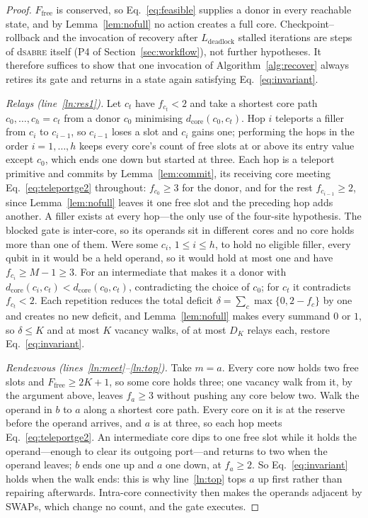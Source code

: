 \documentclass[journal]{IEEEtran}
\newcommand{\dSABRE}{d\textsc{sabre}}
\newcommand{\dcore}{d_{\mathrm{core}}}
\begin{document}
\begin{proof}
$F_{\mathrm{free}}$ is conserved, so Eq.~\eqref{eq:feasible} supplies a donor in every reachable state, and by Lemma~\ref{lem:nofull} no action creates a full core. Checkpoint--rollback and the invocation of recovery after $L_{\mathrm{deadlock}}$ stalled iterations are steps of \dSABRE{} itself (P4 of Section~\ref{sec:workflow}), not further hypotheses. It therefore suffices to show that one invocation of Algorithm~\ref{alg:recover} always retires its gate and returns in a state again satisfying Eq.~\eqref{eq:invariant}.

\emph{Relays (line~\ref{ln:res1}).} Let $c_t$ have $f_{c_t}<2$ and take a shortest core path $c_0,\dots,c_h=c_t$ from a donor $c_0$ minimising $\dcore(c_0,c_t)$. Hop $i$ teleports a filler from $c_i$ to $c_{i-1}$, so $c_{i-1}$ loses a slot and $c_i$ gains one; performing the hops in the order $i=1,\dots,h$ keeps every core's count of free slots at or above its entry value except $c_0$, which ends one down but started at three. Each hop is a teleport primitive and commits by Lemma~\ref{lem:commit}, its receiving core meeting Eq.~\eqref{eq:teleportge2} throughout: $f_{c_0}\ge3$ for the donor, and for the rest $f_{c_{i-1}}\ge2$, since Lemma~\ref{lem:nofull} leaves it one free slot and the preceding hop adds another. A filler exists at every hop---the only use of the four-site hypothesis. The blocked gate is inter-core, so its operands sit in different cores and no core holds more than one of them. Were some $c_i$, $1\le i\le h$, to hold no eligible filler, every qubit in it would be a held operand, so it would hold at most one and have $f_{c_i}\ge M-1\ge3$. For an intermediate that makes it a donor with $\dcore(c_i,c_t)<\dcore(c_0,c_t)$, contradicting the choice of $c_0$; for $c_t$ it contradicts $f_{c_t}<2$. Each repetition reduces the total deficit $\delta=\sum_c\max\{0,2-f_c\}$ by one and creates no new deficit, and Lemma~\ref{lem:nofull} makes every summand $0$ or $1$, so $\delta\le K$ and at most $K$ vacancy walks, of at most $D_K$ relays each, restore Eq.~\eqref{eq:invariant}.

\emph{Rendezvous (lines~\ref{ln:meet}--\ref{ln:top}).} Take $m=a$. Every core now holds two free slots and $F_{\mathrm{free}}\ge2K+1$, so some core holds three; one vacancy walk from it, by the argument above, leaves $f_a\ge3$ without pushing any core below two. Walk the operand in $b$ to $a$ along a shortest core path. Every core on it is at the reserve before the operand arrives, and $a$ is at three, so each hop meets Eq.~\eqref{eq:teleportge2}. An intermediate core dips to one free slot while it holds the operand---enough to clear its outgoing port---and returns to two when the operand leaves; $b$ ends one up and $a$ one down, at $f_a\ge2$. So Eq.~\eqref{eq:invariant} holds when the walk ends: this is why line~\ref{ln:top} tops $a$ up first rather than repairing afterwards. Intra-core connectivity then makes the operands adjacent by SWAPs, which change no count, and the gate executes.


\end{proof}
\end{document}
